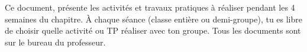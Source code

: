 \teteSndAtom
\reinitialiseActiviteTP
\vspace*{-40pt}
\vspace*{-8pt}

  Ce document,  présente les activités et travaux pratiques à réaliser pendant les 4 semaines du chapitre.
  À chaque séance (classe entière ou demi-groupe), tu es libre de choisir quelle activité ou TP réaliser avec ton groupe.
  Tous les documents sont sur le bureau du professeur.


\vspace*{-18pt}

